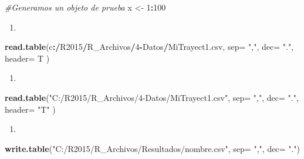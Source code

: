 \documentclass[]{book}
\newenvironment{Shaded}{\begin{snugshade}}{\end{snugshade}}
\newcommand{\CommentTok}[1]{\textcolor[rgb]{0.56,0.35,0.01}{\textit{#1}}}
\newcommand{\DataTypeTok}[1]{\textcolor[rgb]{0.13,0.29,0.53}{#1}}
\newcommand{\DecValTok}[1]{\textcolor[rgb]{0.00,0.00,0.81}{#1}}
\newcommand{\ErrorTok}[1]{\textcolor[rgb]{0.64,0.00,0.00}{\textbf{#1}}}
\newcommand{\KeywordTok}[1]{\textcolor[rgb]{0.13,0.29,0.53}{\textbf{#1}}}
\newcommand{\NormalTok}[1]{#1}
\newcommand{\OperatorTok}[1]{\textcolor[rgb]{0.81,0.36,0.00}{\textbf{#1}}}
\newcommand{\StringTok}[1]{\textcolor[rgb]{0.31,0.60,0.02}{#1}}
\begin{document}
\begin{Shaded}
\begin{Highlighting}[]
\CommentTok{#Generamos un objeto de prueba}
\NormalTok{x <-}\StringTok{ }\DecValTok{1}\OperatorTok{:}\DecValTok{100}
\end{Highlighting}
\end{Shaded}

\begin{enumerate}
\def\labelenumi{\arabic{enumi}.}
\item
\end{enumerate}

\begin{Shaded}
\begin{Highlighting}[]
\KeywordTok{read.table}\NormalTok{(c}\OperatorTok{:}\ErrorTok{/}\NormalTok{R2015}\OperatorTok{/}\NormalTok{R_Archivos}\OperatorTok{/}\DecValTok{4}\OperatorTok{-}\NormalTok{Datos}\OperatorTok{/}\NormalTok{MiTrayect1.csv, }\DataTypeTok{sep=} \StringTok{","}\NormalTok{, }\DataTypeTok{dec=} \StringTok{"."}\NormalTok{, }\DataTypeTok{header=}\NormalTok{ T )}
\end{Highlighting}
\end{Shaded}

\begin{enumerate}
\def\labelenumi{\arabic{enumi}.}
\setcounter{enumi}{1}
\item
\end{enumerate}

\begin{Shaded}
\begin{Highlighting}[]
\KeywordTok{read.table}\NormalTok{(}\StringTok{"C:/R2015/R_Archivos/4-Datos/MiTrayect1.csv"}\NormalTok{, }\DataTypeTok{sep=} \StringTok{","}\NormalTok{, }\DataTypeTok{dec=} \StringTok{"."}\NormalTok{, }\DataTypeTok{header=} \StringTok{"T"}\NormalTok{ )}
\end{Highlighting}
\end{Shaded}

\begin{enumerate}
\def\labelenumi{\arabic{enumi}.}
\setcounter{enumi}{2}
\item
\end{enumerate}

\begin{Shaded}
\begin{Highlighting}[]
\KeywordTok{write.table}\NormalTok{(}\StringTok{"C:/R2015/R_Archivos/Resultados/nombre.csv"}\NormalTok{, }\DataTypeTok{sep=} \StringTok{","}\NormalTok{, }\DataTypeTok{dec=} \StringTok{"."}\NormalTok{)}
\end{Highlighting}
\end{Shaded}
\end{document}
